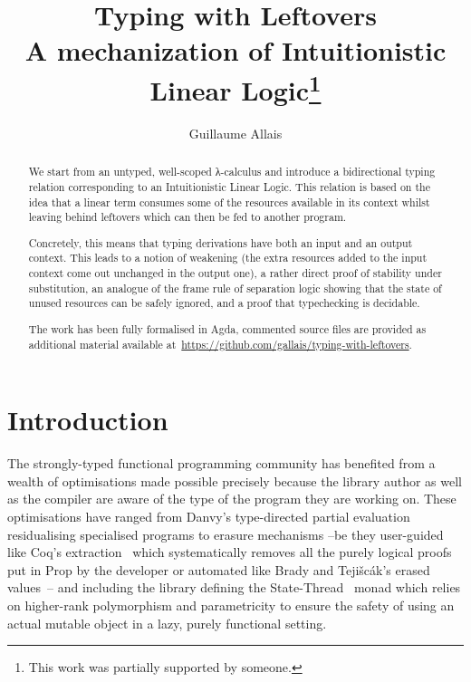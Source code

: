 \documentclass[a4paper,UKenglish]{lipics-v2016}
\title{Typing with Leftovers \protect\\
{\Large A mechanization of Intuitionistic Linear Logic\footnote{This work was partially supported by someone.}}}
\author[1]{Guillaume Allais}
\affil[1]{Nijmegen Quantum Logic Group ─ Radboud University\\
  \texttt{gallais@cs.ru.nl}}
\begin{document}
\maketitle

\begin{abstract}
We start from an untyped, well-scoped λ-calculus and introduce a bidirectional
typing relation corresponding to an Intuitionistic Linear Logic. This
relation is based on the idea that a linear term consumes some of the
resources available in its context whilst leaving behind leftovers
which can then be fed to another program.

Concretely, this means that typing derivations have both an input 
and an output context. This leads to a notion of weakening (the extra
resources added to the input context come out unchanged in the output
one), a rather direct proof of stability under substitution, an
analogue of the frame rule of separation logic showing that the 
state of unused resources can be safely ignored, and a proof that
typechecking is decidable.

The work has been fully formalised in Agda, commented source files 
are provided as additional material available at~\url{https://github.com/gallais/typing-with-leftovers}.
\end{abstract}

\section{Introduction}

The strongly-typed functional programming community has benefited from
a wealth of optimisations made possible precisely because the library
author as well as the compiler are aware of the type of the program they
are working on. These optimisations have ranged from Danvy's type-directed
partial evaluation~\cite{Danvy1999Type} residualising specialised programs
to erasure mechanisms --be they user-guided like Coq's extraction~\cite{letouzey2002new}
which systematically removes all the purely logical proofs put in Prop by
the developer or automated like Brady and Teji{\v{s}}c{\'a}k's erased
values~\cite{brady2003inductive,bradypractical}-- and including the library
defining the State-Thread~\cite{launchbury1994lazy} monad which relies on
higher-rank polymorphism and parametricity to ensure the safety of using an
actual mutable object in a lazy, purely functional setting.
\end{document}
